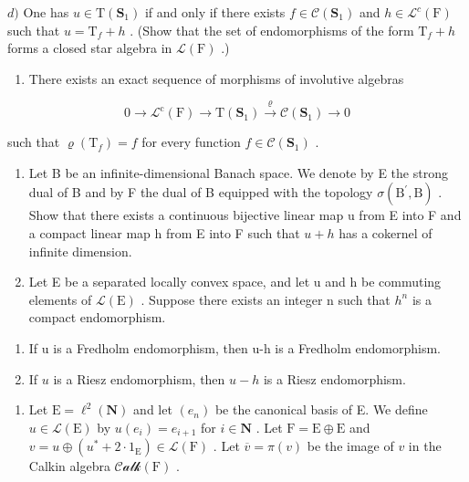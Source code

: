 \(d)\) One has \(u \in \mathrm{T}(\mathbf{S}_1)\) if and only if there exists \(f \in \mathcal{C}(\mathbf{S}_1)\) and \(h \in \mathcal{L}^c(\mathrm{F})\) such that \(u = \mathrm{T}_f + h\) . (Show that the set of endomorphisms of the form \(\mathrm{T}_f + h\) forms a closed star algebra in \(\mathcal{L}(\mathrm{F})\) .)

\begin{enumerate}
\def\labelenumi{\alph{enumi})}
\setcounter{enumi}{4}
\tightlist
\item
  There exists an exact sequence of morphisms of involutive algebras
\end{enumerate}

\[
0 \longrightarrow \mathcal {L} ^ {\mathrm{c}} (\mathrm{F}) \longrightarrow \mathrm{T} (\mathbf {S} _ {1}) \stackrel {\varrho} {\longrightarrow} \mathcal {C} (\mathbf {S} _ {1}) \longrightarrow 0
\]

such that \(\varrho(\mathrm{T}_f) = f\) for every function \(f \in \mathcal{C}(\mathbf{S}_1)\) .

\begin{enumerate}
\def\labelenumi{\arabic{enumi})}
\setcounter{enumi}{8}
\item
  Let B be an infinite-dimensional Banach space. We denote by E the strong dual of B and by F the dual of B equipped with the topology \(\sigma(\mathrm{B}^{\prime},\mathrm{B})\) . Show that there exists a continuous bijective linear map u from E into F and a compact linear map h from E into F such that \(u + h\) has a cokernel of infinite dimension.
\item
  Let E be a separated locally convex space, and let u and h be commuting elements of \(\mathcal{L}(\mathrm{E})\) . Suppose there exists an integer n such that \(h^{n}\) is a compact endomorphism.
\end{enumerate}

\begin{enumerate}
\def\labelenumi{\alph{enumi})}
\item
  If u is a Fredholm endomorphism, then u-h is a Fredholm endomorphism.
\item
  If \(u\) is a Riesz endomorphism, then \(u - h\) is a Riesz endomorphism.
\end{enumerate}

\begin{enumerate}
\def\labelenumi{\arabic{enumi})}
\setcounter{enumi}{10}
\tightlist
\item
  Let \(\mathrm{E} = \ell^2 (\mathbf{N})\) and let \((e_n)\) be the canonical basis of E. We define \(u\in \mathcal{L}(\mathrm{E})\) by \(u(e_i) = e_{i + 1}\) for \(i\in \mathbf{N}\) . Let \(\mathrm{F} = \mathrm{E}\oplus \mathrm{E}\) and \(v = u\oplus (u^{*} + 2\cdot 1_{\mathrm{E}})\in \mathcal{L}(\mathrm{F})\) . Let \(\overline{v} = \pi (v)\) be the image of \(v\) in the Calkin algebra \(\mathcal{Calk}(\mathrm{F})\) .
\end{enumerate}

